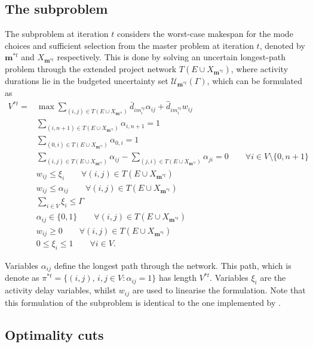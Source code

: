 \documentclass[a4paper,abstracton]{scrartcl}
\newcommand{\U}{{\mathcal{U}}}
\begin{document}
\subsection{The subproblem}
 
The subproblem at iteration $t$ considers the worst-case makespan for the mode choices and sufficient selection from the master problem at iteration $t$, denoted by $\bm{m}^{*t}$ and $X_{\bm{m}^{*t}}$ respectively. This is done by solving an uncertain longest-path problem through the extended project network $T(E\cup X_{\bm{m}^{*t}})$, where activity durations lie in the budgeted uncertainty set $\U_{\bm{m}^{*t}}(\Gamma)$, which can be formulated as 
\begin{align}
	V^{*t} = &\max \sum_{(i,j)\in T(E\cup X_{\bm{m}^{*t}})} \bar{d}_{im^{*t}_i}\alpha_{ij} + \hat{d}_{im^{*t}_i}w_{ij}\label{eqn:subproblem_first}\\
	& \sum_{(i,n+1)\in T(E\cup X_{\bm{m}^{*t}})} \alpha_{i,n+1} = 1\\
	& \sum_{(0,i)\in T(E\cup X_{\bm{m}^{*t}})} \alpha_{0,i} = 1\\
	& \sum_{(i,j)\in T(E\cup X_{\bm{m}^{*t}})} \alpha_{ij} - \sum_{(j,i)\in T(E\cup X_{\bm{m}^{*t}})} \alpha_{ji} = 0 \qquad \forall i \in V\setminus\{0,n+1\}\\
	& w_{ij} \leq \xi_i \qquad \forall (i,j)\in T(E\cup X_{\bm{m}^{*t}})\\
	& w_{ij} \leq \alpha_{ij} \qquad \forall (i,j)\in T(E\cup X_{\bm{m}^{*t}})\\
	& \sum_{i\in V}\xi_i \leq \Gamma\\
	& \alpha_{ij}\in \{0,1\} \qquad \forall (i,j)\in T(E\cup X_{\bm{m}^{*t}})\\
	& w_{ij}\geq 0 \qquad \forall (i,j)\in T(E\cup X_{\bm{m}^{*t}})\\
	& 0\leq \xi_i \leq 1 \qquad \forall i\in V. \label{eqn:subproblem_last}
\end{align}

Variables $\alpha_{ij}$ define the longest path through the network. This path, which is denote as $\pi^{*t}=\{(i,j),\,i,j\in V:\alpha_{ij}=1\}$ has length $V^{*t}$. Variables $\xi_i$ are the activity delay variables, whilst $w_{ij}$ are used to linearise the formulation. Note that this formulation of the subproblem is identical to the one implemented by \cite{balouka2021robust}.



\subsection{Optimality cuts} \label{section:optimality_cuts}
\end{document}
